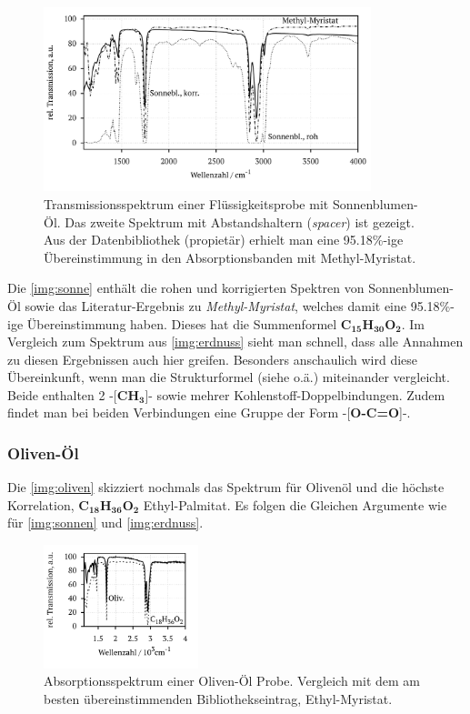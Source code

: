 \documentclass[numbers=noenddot,a4paper,10pt,twocolumn]{article}
\newcommand{\tilt}[1]{\textit{#1}}
\newcommand{\fett}[1]{\textbf{#1}}
\begin{document}
			\begin{figure}
			\centering
				\includegraphics[width=0.85\textwidth]{Gruppe2A/sonnen.pdf}
				\caption{Transmissionsspektrum einer Fl\"ussigkeitsprobe mit Sonnenblumen-\"Ol. Das zweite Spektrum mit Abstandshaltern (\tilt{spacer}) ist gezeigt. Aus der Datenbibliothek (propiet\"ar) erhielt man eine 95.18\%-ige \"Ubereinstimmung in den Absorptionsbanden mit Methyl-Myristat.} 
				\label{img:sonnen}
			\end{figure}
		
		Die \autoref{img:sonne} enth\"alt die rohen und korrigierten Spektren von Sonnenblumen-\"Ol sowie das Literatur-Ergebnis zu \tilt{Methyl-Myristat}, welches damit eine 95.18\%-ige \"Ubereinstimmung haben. Dieses hat die Summenformel \fett{C}$_{\fett{15}}$\fett{H}$_{\fett{30}}$\fett{O}$_{\fett{2}}$. Im Vergleich zum Spektrum aus \autoref{img:erdnuss} sieht man schnell, dass alle Annahmen zu diesen Ergebnissen auch hier greifen. Besonders anschaulich wird diese \"Ubereinkunft, wenn man die Strukturformel (siehe \cite{FTIRStruk} o.\"a.) miteinander vergleicht. Beide enthalten 2 -[\fett{CH}$_{\fett{3}}$]- sowie mehrer Kohlenstoff-Doppelbindungen. Zudem findet man bei beiden Verbindungen eine Gruppe der Form -[\fett{O-C=O}]-.
		
		\subsubsection*{Oliven-\"Ol}

		Die \autoref{img:oliven} skizziert nochmals das Spektrum f\"ur Oliven\"ol und die h\"ochste Korrelation, \fett{C}$_{\fett{18}}$\fett{H}$_{\fett{36}}$\fett{O}$_{\fett{2}}$ Ethyl-Palmitat. Es folgen die Gleichen Argumente wie f\"ur \autoref{img:sonnen} und \autoref{img:erdnuss}.

			\begin{figure}[h]
			\centering
				\includegraphics[width=0.4\textwidth]{Gruppe2A/oliven.pdf}
				\caption{Absorptionsspektrum einer Oliven-\"Ol Probe. Vergleich mit dem am besten \"ubereinstimmenden Bibliothekseintrag, Ethyl-Myristat.}
				\label{img:oliven}
			\end{figure}
\end{document}
